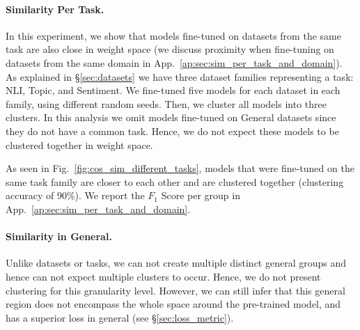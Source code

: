 \documentclass[nohyperref]{article}
\theoremstyle{plain}
\theoremstyle{definition}
\theoremstyle{remark}
\begin{document}
\paragraph{Similarity Per Task.}
In this experiment, we show that models fine-tuned on datasets from the same task are also close in weight space (we discuss proximity when fine-tuning on datasets from the same domain in App.~\ref{ap:sec:sim_per_task_and_domain}). As explained in \S\ref{sec:datasets} we have three dataset families representing a task: NLI, Topic, and Sentiment. We fine-tuned five models for each dataset in each family, using different random seeds. Then, we cluster all models into three clusters. In this analysis we omit models fine-tuned on General datasets since they do not have a common task. Hence, we do not expect these models to be clustered together in weight space. 

As seen in Fig.~\ref{fig:cos_sim_different_tasks}, models that were fine-tuned on the same task family are closer to each other and are clustered together (clustering accuracy of 90\%). We report the $F_1$ Score per group in App.~\ref{ap:sec:sim_per_task_and_domain}.





\paragraph{Similarity in General.}
Unlike datasets or tasks, we can not create multiple distinct general groups and hence can not expect multiple clusters to occur. Hence, we do not present clustering for this granularity level. However, we can still infer that this general region does not encompass the whole space around the pre-trained model, and has a superior loss in general (see \S\ref{sec:loss_metric}).
\end{document}
